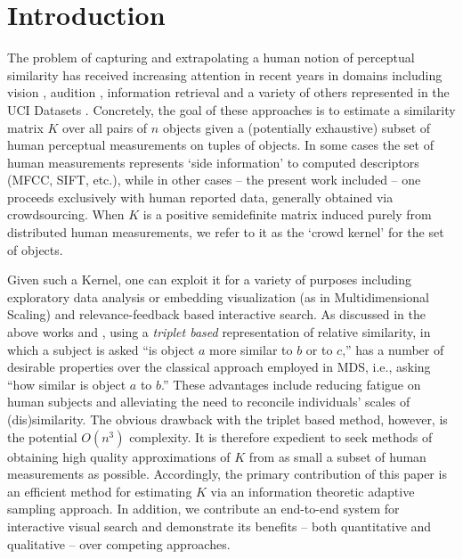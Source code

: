 \documentclass{article}
\begin{document}
\section{Introduction}
The problem of capturing and extrapolating a human notion of perceptual similarity has received increasing attention in recent years in domains including vision \cite{Agarwal07}, audition \cite{McFee09}, information retrieval \cite{Schultz03} and a variety of others represented in the UCI Datasets \cite{Xing02,Huang10}.  Concretely, the goal of these approaches is to estimate a similarity matrix $K$ over all pairs of $n$ objects given a (potentially exhaustive) subset of human perceptual measurements on tuples of objects.  In some cases the set of human measurements represents `side information' to computed descriptors (MFCC, SIFT, etc.), while in other cases -- the present work included -- one proceeds exclusively with human reported data, generally obtained via crowdsourcing.  When $K$ is a positive semidefinite matrix induced purely from distributed human measurements, we refer to it as the `crowd kernel' for the set of objects.

Given such a Kernel, one can exploit it for a variety of purposes including exploratory data analysis or embedding visualization (as in Multidimensional Scaling) and relevance-feedback based interactive search.  As discussed in the above works and \cite{Kendall90}, using a {\em triplet based} representation of relative similarity, in which a subject is asked ``is object $a$ more similar to $b$ or to $c$,'' has a number of desirable properties over the classical approach employed in MDS, i.e., asking ``how similar is object $a$ to $b$.''  These advantages include reducing fatigue on human subjects and alleviating the need to reconcile individuals' scales of (dis)similarity.  The obvious drawback with the triplet based method, however, is the potential $O(n^3)$ complexity.  It is therefore expedient to seek methods of obtaining high quality approximations of $K$ from as small a subset of human measurements as possible.  Accordingly, the primary contribution of this paper is an efficient method for estimating $K$ via an information theoretic adaptive sampling approach.  In addition, we contribute an end-to-end system for interactive visual search and demonstrate its benefits -- both quantitative and qualitative -- over competing approaches.
\end{document}
